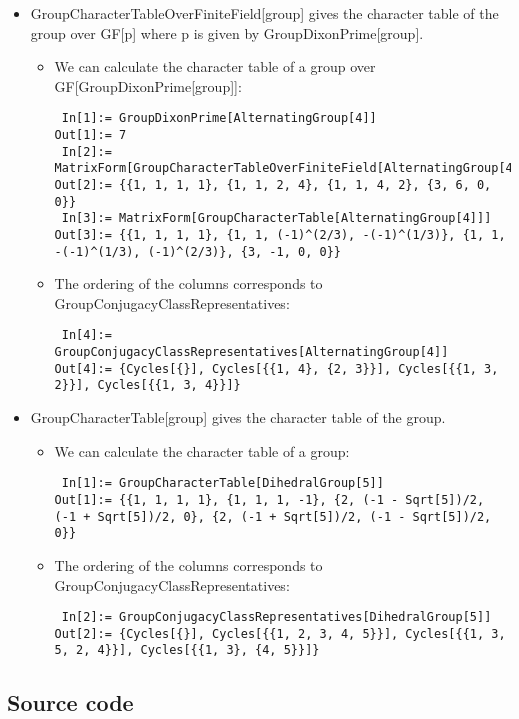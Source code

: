 \begin{itemize}
\item GroupCharacterTableOverFiniteField[group] gives the character table of the group over GF[p] where p is given by GroupDixonPrime[group].
\begin{itemize}
\item We can calculate the character table of a group over GF[GroupDixonPrime[group]]:
\begin{lstlisting}
 In[1]:= GroupDixonPrime[AlternatingGroup[4]]
Out[1]:= 7
 In[2]:= MatrixForm[GroupCharacterTableOverFiniteField[AlternatingGroup[4]]]
Out[2]:= {{1, 1, 1, 1}, {1, 1, 2, 4}, {1, 1, 4, 2}, {3, 6, 0, 0}}
 In[3]:= MatrixForm[GroupCharacterTable[AlternatingGroup[4]]]
Out[3]:= {{1, 1, 1, 1}, {1, 1, (-1)^(2/3), -(-1)^(1/3)}, {1, 1, -(-1)^(1/3), (-1)^(2/3)}, {3, -1, 0, 0}}
\end{lstlisting}
\item The ordering of the columns corresponds to GroupConjugacyClassRepresentatives:
\begin{lstlisting}
 In[4]:= GroupConjugacyClassRepresentatives[AlternatingGroup[4]]
Out[4]:= {Cycles[{}], Cycles[{{1, 4}, {2, 3}}], Cycles[{{1, 3, 2}}], Cycles[{{1, 3, 4}}]}
\end{lstlisting}
\end{itemize}

\item GroupCharacterTable[group] gives the character table of the group.
\begin{itemize}
\item We can calculate the character table of a group:
\begin{lstlisting}
 In[1]:= GroupCharacterTable[DihedralGroup[5]]
Out[1]:= {{1, 1, 1, 1}, {1, 1, 1, -1}, {2, (-1 - Sqrt[5])/2, (-1 + Sqrt[5])/2, 0}, {2, (-1 + Sqrt[5])/2, (-1 - Sqrt[5])/2, 0}}
\end{lstlisting}
\item The ordering of the columns corresponds to GroupConjugacyClassRepresentatives:
\begin{lstlisting}
 In[2]:= GroupConjugacyClassRepresentatives[DihedralGroup[5]]
Out[2]:= {Cycles[{}], Cycles[{{1, 2, 3, 4, 5}}], Cycles[{{1, 3, 5, 2, 4}}], Cycles[{{1, 3}, {4, 5}}]}
\end{lstlisting}
\end{itemize}

\end{itemize}

\clearpage
\subsection{Source code}

